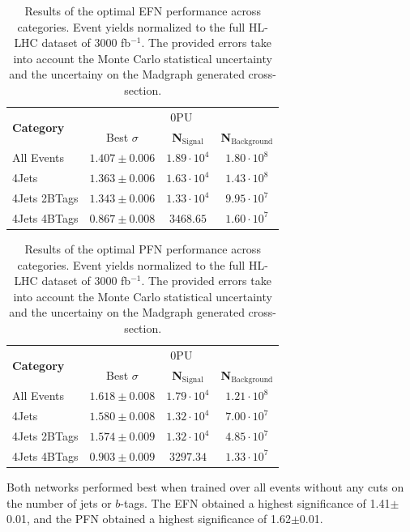 \begin{table}[ht!]
\centering
    \begin{tabular}{|l|c|c|c|} %
      \hline\hline
      \multirow{2}{*}{\textbf{Category}} & \multicolumn{3}{c|}{0PU}\\
      \cline{2-4}
      & Best $\sigma$ & \textbf{N$_{\mathrm{Signal}}$} & \textbf{N$_{\mathrm{Background}}$} \\
      \hline
      All Events & $1.407 \pm 0.006$ & $1.89\cdot 10^4$ & $1.80\cdot 10^8$ \\
      4Jets & $1.363 \pm 0.006$ & $1.63\cdot 10^4$ & $1.43\cdot 10^8$ \\
      4Jets 2BTags & $1.343 \pm 0.006$ & $1.33\cdot 10^4$ & $9.95\cdot 10^7$ \\
      4Jets 4BTags & $0.867 \pm 0.008$ & $3468.65$ & $1.60\cdot 10^7$ \\
      \hline\hline
    \end{tabular}
    \caption{Results of the optimal EFN performance across categories. Event yields normalized to the full HL-LHC dataset of 3000 fb$^{-1}$. The provided errors take into account the Monte Carlo statistical uncertainty and the uncertainy on the Madgraph generated cross-section.}
\label{EFNtab}
\end{table}

\begin{table}[ht!]
\centering
    \begin{tabular}{|l|c|c|c|} %
      \hline\hline
      \multirow{2}{*}{\textbf{Category}} & \multicolumn{3}{c|}{0PU}\\
      \cline{2-4}
      & Best $\sigma$ & \textbf{N$_{\mathrm{Signal}}$} & \textbf{N$_{\mathrm{Background}}$} \\
      \hline
      All Events & $1.618 \pm 0.008$ & $1.79\cdot 10^4$ & $1.21\cdot 10^8$ \\
      4Jets & $1.580 \pm 0.008$ & $1.32\cdot 10^4$ & $7.00\cdot 10^7$ \\
      4Jets 2BTags & $1.574 \pm 0.009$ & $1.32\cdot 10^4$ & $4.85\cdot 10^7$ \\
      4Jets 4BTags & $0.903 \pm 0.009$ & $3297.34$ & $1.33\cdot 10^7$ \\
      \hline\hline
    \end{tabular}
    \caption{Results of the optimal PFN performance across categories. Event yields normalized to the full HL-LHC dataset of 3000 fb$^{-1}$. The provided errors take into account the Monte Carlo statistical uncertainty and the uncertainy on the Madgraph generated cross-section.}
\label{PFNtab}
\end{table}

Both networks performed best when trained over all events without any cuts on the number of jets or $b$-tags. The EFN obtained a highest significance of 1.41$\pm$0.01, and the PFN obtained a highest significance of 1.62$\pm$0.01.

